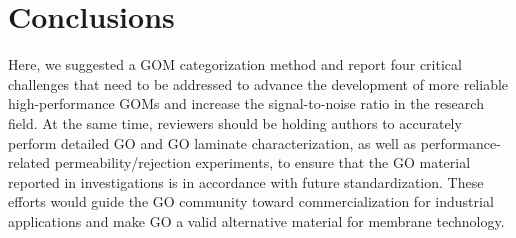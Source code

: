 \section{Conclusions}
Here, we suggested a GOM categorization method and report four critical challenges that need to be addressed to advance the development of more reliable high-performance GOMs and increase the signal-to-noise ratio in the research field. At the same time, reviewers should be holding authors to accurately perform detailed GO and GO laminate characterization, as well as performance-related permeability/rejection experiments, to ensure that the GO material reported in investigations is in accordance with future standardization. These efforts would guide the GO community toward commercialization for industrial applications and make GO a valid alternative material for membrane technology.